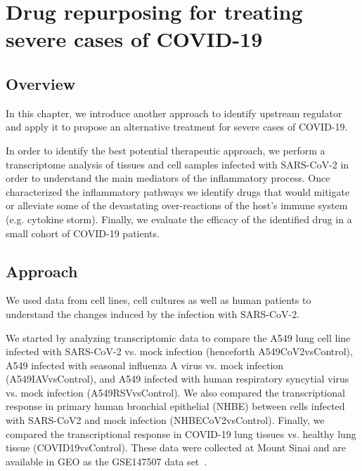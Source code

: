 \section{Drug repurposing for treating severe cases of COVID-19}
\label{chap:Covid19}

\subsection{Overview}

In this chapter, we introduce another approach to identify upstream regulator and apply it to propose an alternative treatment for severe cases of COVID-19.

In order to identify the best potential therapeutic approach, we perform a transcriptome analysis of tissues and cell samples infected with SARS-CoV-2 in order to understand the main mediators of the inflammatory process. Once characterized the inflammatory pathways we identify drugs that would mitigate or alleviate some of the devastating over-reactions of the host's immune system (e.g. cytokine storm). Finally, we evaluate the efficacy of the identified drug in a small cohort of COVID-19 patients.

\subsection{Approach}

We used data from cell lines, cell cultures as well as human patients to understand the changes induced by the infection with SARS-CoV-2. 


We started by analyzing transcriptomic data to compare the A549 lung cell line infected with SARS-CoV-2 vs. mock infection  (henceforth A549CoV2vsControl), A549 infected with seasonal influenza A virus vs. mock infection   (A549IAVvsControl), and A549 infected with human respiratory syncytial virus vs. mock infection  (A549RSVvsControl). We also compared the transcriptional response in primary human bronchial epithelial (NHBE) between cells infected with SARS-CoV2 and mock infection  (NHBECoV2vsControl). Finally, we compared the transcriptional response in COVID-19 lung tissues vs. healthy lung tissue  (COVID19vsControl). 
These data were collected at Mount Sinai and are available in GEO as the GSE147507 data set~\cite{Blanco-Melo:2020}. 

